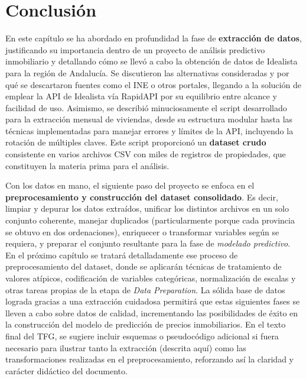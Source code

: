 \documentclass[a4paper,11pt]{book}
\begin{document}
\section*{Conclusión}

En este capítulo se ha abordado en profundidad la fase de \textbf{extracción de datos}, justificando su importancia dentro de un proyecto de análisis predictivo inmobiliario y detallando cómo se llevó a cabo la obtención de datos de Idealista para la región de Andalucía. Se discutieron las alternativas consideradas y por qué se descartaron fuentes como el INE o otros portales, llegando a la solución de emplear la API de Idealista vía RapidAPI por su equilibrio entre alcance y facilidad de uso. Asimismo, se describió minuciosamente el script desarrollado para la extracción mensual de viviendas, desde su estructura modular hasta las técnicas implementadas para manejar errores y límites de la API, incluyendo la rotación de múltiples claves. Este script proporcionó un \textbf{dataset crudo} consistente en varios archivos CSV con miles de registros de propiedades, que constituyen la materia prima para el análisis.

Con los datos en mano, el siguiente paso del proyecto se enfoca en el \textbf{preprocesamiento y construcción del dataset consolidado}. Es decir, limpiar y depurar los datos extraídos, unificar los distintos archivos en un solo conjunto coherente, manejar duplicados (particularmente porque cada provincia se obtuvo en dos ordenaciones), enriquecer o transformar variables según se requiera, y preparar el conjunto resultante para la fase de \textit{modelado predictivo}. En el próximo capítulo se tratará detalladamente ese proceso de preprocesamiento del dataset, donde se aplicarán técnicas de tratamiento de valores atípicos, codificación de variables categóricas, normalización de escalas y otras tareas propias de la etapa de \textit{Data Preparation}. La sólida base de datos lograda gracias a una extracción cuidadosa permitirá que estas siguientes fases se lleven a cabo sobre datos de calidad, incrementando las posibilidades de éxito en la construcción del modelo de predicción de precios inmobiliarios. En el texto final del TFG, se sugiere incluir esquemas o pseudocódigo adicional si fuera necesario para ilustrar tanto la extracción (descrita aquí) como las transformaciones realizadas en el preprocesamiento, reforzando así la claridad y carácter didáctico del documento.


\end{document}
